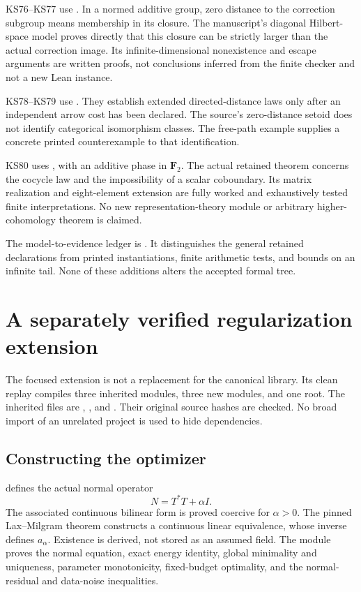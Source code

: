 \documentclass[11pt]{article}
\begin{document}
KS76--KS77 use . In a normed additive group, zero distance to the correction subgroup means membership in its closure. The manuscript's diagonal Hilbert-space model proves directly that this closure can be strictly larger than the actual correction image. Its infinite-dimensional nonexistence and escape arguments are written proofs, not conclusions inferred from the finite checker and not a new Lean instance.

KS78--KS79 use . They establish extended directed-distance laws only after an independent arrow cost has been declared. The source's zero-distance setoid does not identify categorical isomorphism classes. The free-path example supplies a concrete printed counterexample to that identification.

KS80 uses , with an additive phase in \(\mathbf F_2\). The actual retained theorem concerns the cocycle law and the impossibility of a scalar coboundary. Its matrix realization and eight-element extension are fully worked and exhaustively tested finite interpretations. No new representation-theory module or arbitrary higher-cohomology theorem is claimed.

The model-to-evidence ledger is . It distinguishes the general retained declarations from printed instantiations, finite arithmetic tests, and bounds on an infinite tail. None of these additions alters the accepted formal tree.

\section{A separately verified regularization extension}
The focused extension is not a replacement for the canonical library. Its clean replay compiles three inherited modules, three new modules, and one root. The inherited files are , , and . Their original source hashes are checked. No broad import of an unrelated project is used to hide dependencies.

\subsection{Constructing the optimizer}
 defines the actual normal operator
\[
 N=T^*T+\alpha I.
\]
The associated continuous bilinear form is proved coercive for $\alpha>0$. The pinned Lax--Milgram theorem constructs a continuous linear equivalence, whose inverse defines $a_\alpha$. Existence is derived, not stored as an assumed field. The module proves the normal equation, exact energy identity, global minimality and uniqueness, parameter monotonicity, fixed-budget optimality, and the normal-residual and data-noise inequalities.
\end{document}

